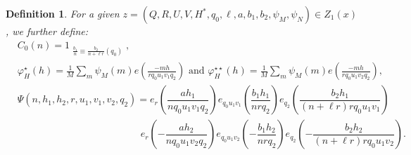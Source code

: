 \documentclass{amsart}
\newtheorem{defn}{Definition}
\numberwithin{equation}{section}
\begin{document}
\begin{defn}\label{def:Z1functions}
For a given $z=(Q,R,U,V,H^*,q_0,\ell,a,b_1,b_2,\psi_M,\psi_N)\in Z_1(x)$, we further define:
\begin{align*}
&C_0(n) = 1_{\substack{\frac{b_1}{n}  \equiv \frac{b_2}{n+\ell r} (q_0)}},
\\
&\varphi_H^{\star}(h)=  \frac{1}{M}
\sum_m \psi_M(m)   e\!\left(\frac{-mh}{rq_0u_1v_1q_2} \right) \mbox{ and } 
\varphi_H^{\star\star}(h)=  \frac{1}{M}
\sum_m \psi_M(m)   e\!\left(\frac{-mh}{rq_0u_1v_2q_2} \right),\\
&\Psi(n,h_1,h_2,r,u_1,v_1,v_2,q_2)=e_r\left(\dfrac{ah_1}{nq_0u_1v_1q_2}\right)e_{q_0u_1v_1}\left(\dfrac{b_1h_1}{nrq_2}\right)e_{q_2}\left(\dfrac{b_2h_1}{(n+\ell r)rq_0u_1v_1}\right)\\
&\qquad\qquad\qquad\qquad\qquad\qquad\,\,\, e_r\left(-\dfrac{ah_2}{nq_0u_1v_2q_2}\right)e_{q_0u_1v_2}\left(-\dfrac{b_1h_2}{nrq_2}\right)e_{q_2}\left(-\dfrac{b_2h_2}{(n+\ell r)rq_0u_1v_2}\right). 
\end{align*}

\end{defn}
\end{document}
